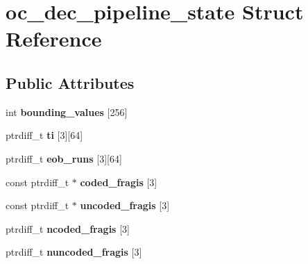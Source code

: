 \hypertarget{structoc__dec__pipeline__state}{\section{oc\+\_\+dec\+\_\+pipeline\+\_\+state Struct Reference}
\label{structoc__dec__pipeline__state}
}
\subsection*{Public Attributes}
\begin{DoxyCompactItemize}
\item 
\hypertarget{structoc__dec__pipeline__state_a6a9b6743f4f58ebb61fdb5353d672c33}{int {\bfseries bounding\+\_\+values} \mbox{[}256\mbox{]}}\label{structoc__dec__pipeline__state_a6a9b6743f4f58ebb61fdb5353d672c33}

\item 
\hypertarget{structoc__dec__pipeline__state_ab9fff09661bc4784d615583bfef71f58}{ptrdiff\+\_\+t {\bfseries ti} \mbox{[}3\mbox{]}\mbox{[}64\mbox{]}}\label{structoc__dec__pipeline__state_ab9fff09661bc4784d615583bfef71f58}

\item 
\hypertarget{structoc__dec__pipeline__state_a2c47005c73d905d8035179ca293ee8c2}{ptrdiff\+\_\+t {\bfseries eob\+\_\+runs} \mbox{[}3\mbox{]}\mbox{[}64\mbox{]}}\label{structoc__dec__pipeline__state_a2c47005c73d905d8035179ca293ee8c2}

\item 
\hypertarget{structoc__dec__pipeline__state_a2daae5dc05cf725ef47b5764e6a8dc75}{const ptrdiff\+\_\+t $\ast$ {\bfseries coded\+\_\+fragis} \mbox{[}3\mbox{]}}\label{structoc__dec__pipeline__state_a2daae5dc05cf725ef47b5764e6a8dc75}

\item 
\hypertarget{structoc__dec__pipeline__state_a9d6d320e46c3ba7d4574946b88cb8364}{const ptrdiff\+\_\+t $\ast$ {\bfseries uncoded\+\_\+fragis} \mbox{[}3\mbox{]}}\label{structoc__dec__pipeline__state_a9d6d320e46c3ba7d4574946b88cb8364}

\item 
\hypertarget{structoc__dec__pipeline__state_a3af1449f82cc35ea5cfc31f62f63d88e}{ptrdiff\+\_\+t {\bfseries ncoded\+\_\+fragis} \mbox{[}3\mbox{]}}\label{structoc__dec__pipeline__state_a3af1449f82cc35ea5cfc31f62f63d88e}

\item 
\hypertarget{structoc__dec__pipeline__state_afeb849a30a52c0bc44ef5b3a08adf574}{ptrdiff\+\_\+t {\bfseries nuncoded\+\_\+fragis} \mbox{[}3\mbox{]}}\label{structoc__dec__pipeline__state_afeb849a30a52c0bc44ef5b3a08adf574}


\end{DoxyCompactItemize}
